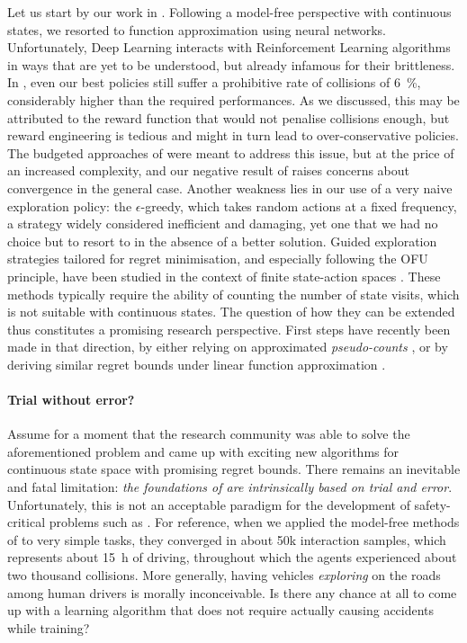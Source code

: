Let us start by our work in . Following a model-free perspective with continuous states, we resorted to function approximation using neural networks. Unfortunately, Deep Learning interacts with Reinforcement Learning algorithms in ways that are yet to be understood, but already infamous for their brittleness. In , even our best policies still suffer a prohibitive rate of collisions of \SI{6}{\percent}, considerably higher than the required performances. 
As we discussed, this may be attributed to the reward function that would not penalise collisions enough, but reward engineering is tedious and might in turn lead to over-conservative policies. The budgeted approaches of  were meant to address this issue, but at the price of an increased complexity, and our negative result of  raises concerns about convergence in the general case. 
Another weakness lies in our use of a very naive exploration policy: the $\epsilon$-greedy, which takes random actions at a fixed frequency, a strategy widely considered inefficient and damaging, yet one that we had no choice but to resort to in the absence of a better solution. Guided exploration strategies tailored for regret minimisation, and especially following the \gls{OFU} principle, have been studied in the context of finite state-action spaces \citep{Auer2009,Azar2017}. 
These methods typically require the ability of counting the number of state visits, which is not suitable with continuous states. The question of how they can be extended thus constitutes a promising research perspective. First steps have recently been made in that direction, by either relying on approximated \emph{pseudo-counts} \citep{Guyon2017}, or by deriving similar regret bounds under linear function approximation \citep{Jin2020}.

\paragraph{Trial without error?}

Assume for a moment that the research community was able to solve the aforementioned problem and came up with exciting new algorithms for continuous state space with promising regret bounds. There remains an inevitable and fatal limitation: \emph{the foundations of  are intrinsically based on trial and error}. Unfortunately, this is not an acceptable paradigm for the development of safety-critical problems such as . For reference, when we applied the model-free methods of  to very simple tasks, they converged in about 50k interaction samples, which represents about \SI{15}{\hour} of driving, throughout which the agents experienced about two thousand collisions. More generally, having vehicles \emph{exploring} on the roads among human drivers is morally inconceivable. Is there any chance at all to come up with a learning algorithm that does not require actually causing accidents while training?

